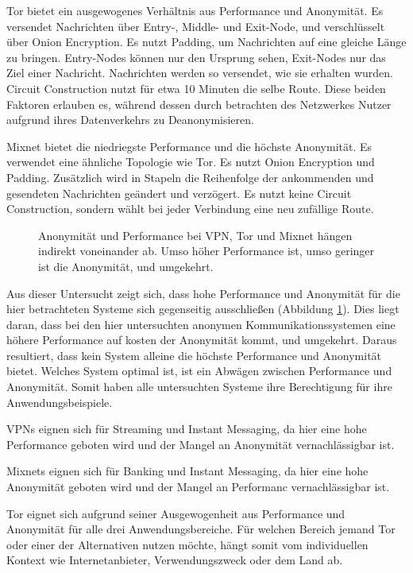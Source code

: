 Tor bietet ein ausgewogenes Verhältnis aus Performance und Anonymität. Es versendet Nachrichten über Entry-, Middle- und Exit-Node, und verschlüsselt über Onion Encryption. Es nutzt Padding, um Nachrichten auf eine gleiche Länge zu bringen. Entry-Nodes können nur den Ursprung sehen, Exit-Nodes nur das Ziel einer Nachricht. Nachrichten werden so versendet, wie sie erhalten wurden. Circuit Construction nutzt für etwa 10 Minuten die selbe Route. Diese beiden Faktoren erlauben es, während dessen durch betrachten des Netzwerkes Nutzer aufgrund ihres Datenverkehrs zu Deanonymisieren.

Mixnet bietet die niedriegste Performance und die höchste Anonymität. Es verwendet eine ähnliche Topologie wie Tor. Es nutzt Onion Encryption und Padding. Zusätzlich wird in Stapeln die Reihenfolge der ankommenden und gesendeten Nachrichten geändert und verzögert. Es nutzt keine Circuit Construction, sondern wählt bei jeder Verbindung eine neu zufällige Route.

\begin{figure}[h!]
    \centering
    
    \caption{Anonymität und Performance bei VPN, Tor und Mixnet hängen indirekt voneinander ab. Umso höher Performance ist, umso geringer ist die Anonymität, und umgekehrt.}
    \label{imgs:systems_discussion}
\end{figure}

Aus dieser Untersucht zeigt sich, dass hohe Performance und Anonymität für die hier betrachteten Systeme sich gegenseitig ausschließen (Abbildung \ref{imgs:systems_discussion}). Dies liegt daran, dass bei den hier untersuchten anonymen Kommunikationssystemen eine höhere Performance auf kosten der Anonymität kommt, und umgekehrt. Daraus resultiert, dass kein System alleine die höchste Performance und Anonymität bietet. Welches System optimal ist, ist ein Abwägen zwischen Performance und Anonymität. Somit haben alle untersuchten Systeme ihre Berechtigung für ihre Anwendungsbeispiele.

VPNs eignen sich für Streaming und Instant Messaging, da hier eine hohe Performance geboten wird und der Mangel an Anonymität vernachlässigbar ist.

Mixnets eignen sich für Banking und Instant Messaging, da hier eine hohe Anonymität geboten wird und der Mangel an Performanc vernachlässigbar ist.

Tor eignet sich aufgrund seiner Ausgewogenheit aus Performance und Anonymität für alle drei Anwendungsbereiche. Für welchen Bereich jemand Tor oder einer der Alternativen nutzen möchte, hängt somit vom individuellen Kontext wie Internetanbieter, Verwendungszweck oder dem Land ab.

